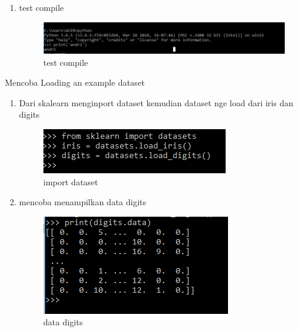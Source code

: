 \begin {enumerate}
\item test compile
\par
\begin{figure}[ht]
\centering
\includegraphics[scale=0.5]{figures/444.png}
\caption{test compile}
\label{contoh4}
\end{figure}
\end {enumerate}
\par

Mencoba Loading an example dataset
\begin {enumerate}
\par
\item Dari skalearn menginport dataset kemudian dataset nge load dari iris dan digits
\par
\begin{figure}[ht]
\centering
\includegraphics[scale=0.5]{figures/555.png}
\caption{import dataset}
\label{contoh5}
\end{figure}
\par
\item mencoba menampilkan data digits
\par
\begin{figure}[ht]
\centering
\includegraphics[scale=0.5]{figures/666.png}
\caption{data digits}
\label{contoh6}
\end{figure}
\end {enumerate}

